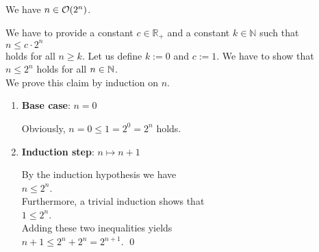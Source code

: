 \example
We have  $n \in \mathcal{O}(2^n)$. 
\ex

\proof
We have to provide a constant $c \in \mathbb{R}_+$ and a constant $k\in\mathbb{N}$ such that 
\\[0.2cm]
\hspace*{1.3cm}
$ n \leq c \cdot 2^n$ 
\\[0.2cm]
holds for all $n \geq k$.  Let us define $k := 0$ and $c := 1$.  We have to show that \\[0.2cm]
\hspace*{1.3cm} $n \leq 2^n$ \quad holds for all $n \in {\mathbb N}$.
\\[0.2cm]
We prove this claim by induction on $n$.
\begin{enumerate}
\item \textbf{Base case}: $n = 0$

      Obviously, $n = 0 \leq 1 = 2^0 = 2^n$ holds.  
\item \textbf{Induction step}: $n \mapsto n + 1$

      By the induction hypothesis we have 
      \\[0.2cm]
      \hspace*{1.3cm}
      $n \leq 2^n$.    
      \\[0.2cm]
      Furthermore, a trivial induction shows that
      \\[0.2cm]
      \hspace*{1.3cm}
      $1 \leq 2^n$.
      \\[0.2cm]
      Adding these two inequalities yields
      \\[0.2cm]
      \hspace*{1.3cm} $n+1 \leq 2^n + 2^n = 2^{n+1}$. \qed
\end{enumerate}
\pagebreak 

